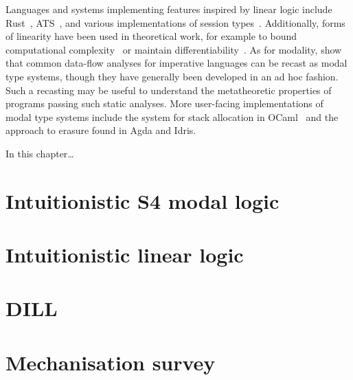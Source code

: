 Languages and systems implementing features inspired by linear logic include
Rust~\citep{MK14,Rust}, ATS~\citep{Xi04,ZX05}, and various implementations of
session types~\citep{HLVCCDMPRTVTZ16}.
Additionally, forms of linearity have been used in theoretical work, for example
to bound computational complexity~\citep{GSS92,Hofmann03} or maintain
differentiability~\citep{ER03,Ehrhard18}.
As for modality, \citet{IMO20} show that common data-flow analyses for
imperative languages can be recast as modal type systems, though they have
generally been developed in an ad hoc fashion.
Such a recasting may be useful to understand the metatheoretic properties of
programs passing such static analyses.
More user-facing implementations of modal type systems include the system for
stack allocation in OCaml~\citep{DW22} and the approach to erasure found in
Agda and Idris.

In this chapter\ldots{}

\section{Intuitionistic S4 modal logic}\label{sec:modal}


\section{Intuitionistic linear logic}\label{sec:ill}


\section{DILL}\label{sec:dill}


\section{Mechanisation survey}

